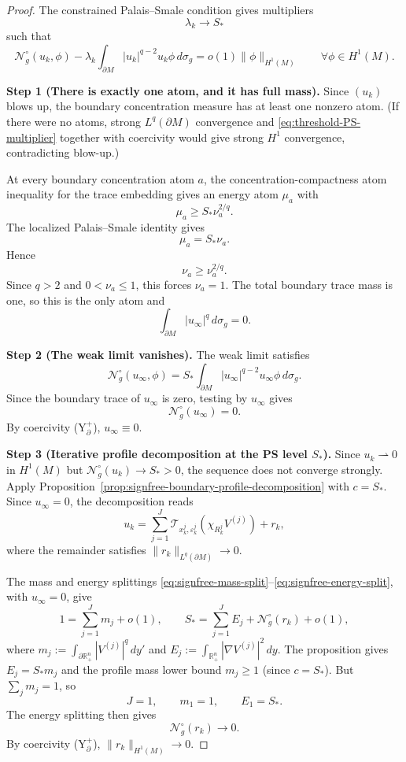 \documentclass[11pt,reqno,a4paper]{amsart}
\newcommand{\R}{\mathbb{R}}
\numberwithin{equation}{section}
\theoremstyle{plain}
\theoremstyle{remark}
\theoremstyle{plain}
\begin{document}
\begin{proof}
The constrained Palais--Smale condition gives multipliers
\[
\lambda_k\to S_\ast
\]
such that
\begin{equation}\label{eq:threshold-PS-multiplier}
\mathcal N_g^\circ(u_k,\phi)
-
\lambda_k
\int_{\partial M}|u_k|^{q-2}u_k\phi\,d\sigma_g
=
o(1)\|\phi\|_{H^1(M)}
\qquad
\forall\phi\in H^1(M).
\end{equation}

\medskip\noindent
\textbf{Step 1 (There is exactly one atom, and it has full mass).}
Since $(u_k)$ blows up, the boundary concentration measure has at least one
nonzero atom.  (If there were no atoms, strong $L^q(\partial M)$ convergence
and \eqref{eq:threshold-PS-multiplier} together with coercivity would give
strong $H^1$ convergence, contradicting blow-up.)

At every boundary concentration atom $a$, the concentration-compactness
atom inequality for the trace embedding gives an energy atom $\mu_a$ with
\[
\mu_a\ge S_\ast\nu_a^{2/q}.
\]
The localized Palais--Smale identity gives
\[
\mu_a=S_\ast\nu_a .
\]
Hence
\[
\nu_a\ge\nu_a^{2/q}.
\]
Since $q>2$ and $0<\nu_a\le1$, this forces $\nu_a=1$.
The total boundary trace mass is one, so this is the only atom and
\[
\int_{\partial M}|u_\infty|^q\,d\sigma_g=0.
\]

\medskip\noindent
\textbf{Step 2 (The weak limit vanishes).}
The weak limit satisfies
\[
\mathcal N_g^\circ(u_\infty,\phi)
=
S_\ast
\int_{\partial M}|u_\infty|^{q-2}u_\infty\phi\,d\sigma_g.
\]
Since the boundary trace of $u_\infty$ is zero, testing by $u_\infty$ gives
\[
\mathcal N_g^\circ(u_\infty)=0.
\]
By coercivity \textup{(Y$^+_\partial$)},
$u_\infty\equiv0$.

\medskip\noindent
\textbf{Step 3 (Iterative profile decomposition at the PS level $S_\ast$).}
Since $u_k\rightharpoonup0$ in $H^1(M)$ but
$\mathcal N_g^\circ(u_k)\to S_\ast>0$, the sequence does not converge
strongly.  Apply
Proposition~\ref{prop:signfree-boundary-profile-decomposition} with
$c=S_\ast$.  Since $u_\infty=0$, the decomposition reads
\[
u_k=\sum_{j=1}^J\mathcal T_{x_k^j,\varepsilon_k^j}(\chi_{R_k^j}V^{(j)})
+r_k,
\]
where the remainder satisfies $\|r_k\|_{L^q(\partial M)}\to0$.

The mass and energy splittings
\eqref{eq:signfree-mass-split}--\eqref{eq:signfree-energy-split}, with
$u_\infty=0$, give
\[
1=\sum_{j=1}^J m_j+o(1),
\qquad
S_\ast=\sum_{j=1}^J E_j+\mathcal N_g^\circ(r_k)+o(1),
\]
where $m_j:=\int_{\partial\R^n_+}|V^{(j)}|^q\,dy'$ and
$E_j:=\int_{\R^n_+}|\nabla V^{(j)}|^2\,dy$.
The proposition gives $E_j=S_\ast m_j$ and the profile mass lower bound
$m_j\ge1$ (since $c=S_\ast$).  But $\sum_j m_j=1$, so
\[
J=1,\qquad m_1=1,\qquad E_1=S_\ast.
\]
The energy splitting then gives
\[
\mathcal N_g^\circ(r_k)\to0.
\]
By coercivity \textup{(Y$^+_\partial$)}, $\|r_k\|_{H^1(M)}\to0$.


\end{proof}
\end{document}
